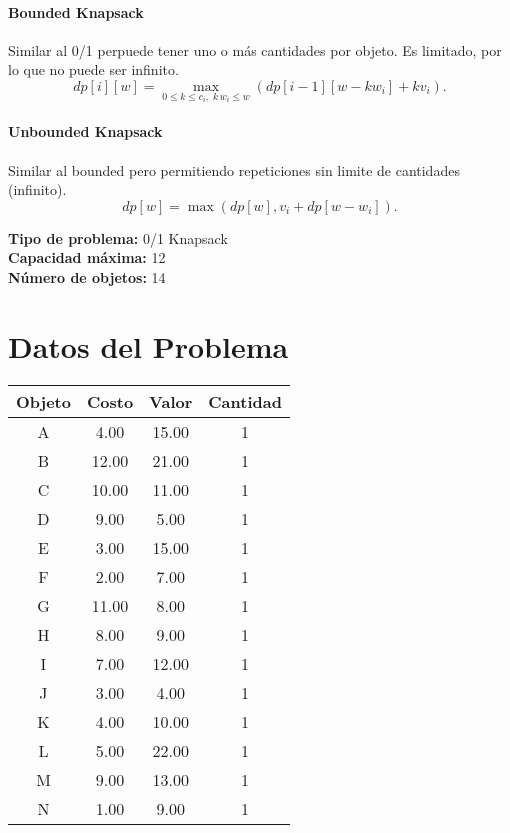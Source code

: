 \documentclass{article}
\begin{document}
\paragraph{Bounded Knapsack} Similar al 0/1 perpuede tener uno o más cantidades por objeto. Es limitado, por lo que no puede ser infinito. 
\[
dp[i][w] = 
\max_{0 \leq k \leq c_i,\; k\,w_i \leq w} \left( dp[i-1][w - k w_i] + k v_i \right).
\]

\paragraph{Unbounded Knapsack} Similar al bounded pero permitiendo repeticiones sin limite de cantidades (infinito).
\[
dp[w] = \max ( dp[w], v_i + dp[w - w_i] ).
\]

\thispagestyle{empty}
\newpage
\textbf{Tipo de problema:} 0/1 Knapsack\\
\textbf{Capacidad máxima:} 12\\
\textbf{Número de objetos:} 14\\

\section*{Datos del Problema}
\begin{tabular}{|c|c|c|c|}
\hline
Objeto & Costo & Valor & Cantidad \\
\hline
A & 4.00 & 15.00 & 1 \\
B & 12.00 & 21.00 & 1 \\
C & 10.00 & 11.00 & 1 \\
D & 9.00 & 5.00 & 1 \\
E & 3.00 & 15.00 & 1 \\
F & 2.00 & 7.00 & 1 \\
G & 11.00 & 8.00 & 1 \\
H & 8.00 & 9.00 & 1 \\
I & 7.00 & 12.00 & 1 \\
J & 3.00 & 4.00 & 1 \\
K & 4.00 & 10.00 & 1 \\
L & 5.00 & 22.00 & 1 \\
M & 9.00 & 13.00 & 1 \\
N & 1.00 & 9.00 & 1 \\
\hline
\end{tabular}
\end{document}
